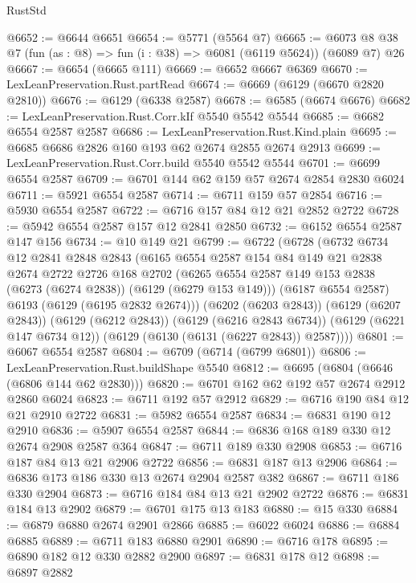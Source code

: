 \begin{lexlean}{RustStd}
\begin{coremodule}
{\begin{coremodule}
{{{{{{{{{{{{{{{{{{{{{{{{{{@6652 := @6644 @6651
@6654 := @5771 (@5564 @7)
@6665 := @6073 @8 @38 @7 (fun (as : @8) => fun (i : @38) => @6081 (@6119 @5624)) (@6089 @7) @26
@6667 := @6654 (@6665 @111)
@6669 := @6652 @6667 @6369
@6670 := LexLeanPreservation.Rust.partRead
@6674 := @6669 (@6129 (@6670 @2820 @2810))
@6676 := @6129 (@6338 @2587)
@6678 := @6585 (@6674 @6676)
@6682 := LexLeanPreservation.Rust.Corr.kIf @5540 @5542 @5544
@6685 := @6682 @6554 @2587 @2587
@6686 := LexLeanPreservation.Rust.Kind.plain
@6695 := @6685 @6686 @2826 @160 @193 @62 @2674 @2855 @2674 @2913
@6699 := LexLeanPreservation.Rust.Corr.build @5540 @5542 @5544
@6701 := @6699 @6554 @2587
@6709 := @6701 @144 @62 @159 @57 @2674 @2854 @2830 @6024
@6711 := @5921 @6554 @2587
@6714 := @6711 @159 @57 @2854
@6716 := @5930 @6554 @2587
@6722 := @6716 @157 @84 @12 @21 @2852 @2722
@6728 := @5942 @6554 @2587 @157 @12 @2841 @2850
@6732 := @6152 @6554 @2587 @147 @156
@6734 := @10 @149 @21
@6799 := @6722
    (@6728
      (@6732
        @6734
        @12
        @2841
        @2848
        @2843
        (@6165
          @6554
          @2587
          @154
          @84
          @149
          @21
          @2838
          @2674
          @2722
          @2726
          @168
          @2702
          (@6265 @6554 @2587 @149 @153 @2838 (@6273 (@6274 @2838)) (@6129 (@6279 @153 @149)))
          (@6187 @6554 @2587)
          @6193
          (@6129 (@6195 @2832 @2674)))
        (@6202 (@6203 @2843))
        (@6129 (@6207 @2843))
        (@6129 (@6212 @2843))
        (@6129 (@6216 @2843 @6734))
        (@6129 (@6221 @147 @6734 @12))
        (@6129 (@6130 (@6131 (@6227 @2843)) @2587))))
@6801 := @6067 @6554 @2587
@6804 := @6709 (@6714 (@6799 @6801))
@6806 := LexLeanPreservation.Rust.buildShape @5540
@6812 := @6695 (@6804 (@6646 (@6806 @144 @62 @2830)))
@6820 := @6701 @162 @62 @192 @57 @2674 @2912 @2860 @6024
@6823 := @6711 @192 @57 @2912
@6829 := @6716 @190 @84 @12 @21 @2910 @2722
@6831 := @5982 @6554 @2587
@6834 := @6831 @190 @12 @2910
@6836 := @5907 @6554 @2587
@6844 := @6836 @168 @189 @330 @12 @2674 @2908 @2587 @364
@6847 := @6711 @189 @330 @2908
@6853 := @6716 @187 @84 @13 @21 @2906 @2722
@6856 := @6831 @187 @13 @2906
@6864 := @6836 @173 @186 @330 @13 @2674 @2904 @2587 @382
@6867 := @6711 @186 @330 @2904
@6873 := @6716 @184 @84 @13 @21 @2902 @2722
@6876 := @6831 @184 @13 @2902
@6879 := @6701 @175 @13 @183
@6880 := @15 @330
@6884 := @6879 @6880 @2674 @2901 @2866
@6885 := @6022 @6024
@6886 := @6884 @6885
@6889 := @6711 @183 @6880 @2901
@6890 := @6716 @178
@6895 := @6890 @182 @12 @330 @2882 @2900
@6897 := @6831 @178 @12
@6898 := @6897 @2882
}}}}}}}}}}}}}}}}}}}}}}}}}}
\end{coremodule}}
\end{coremodule}
\end{lexlean}
